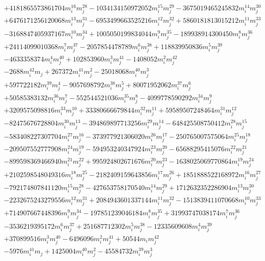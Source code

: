 {\begin{align*}
&+4181865573861704m_i^{16}m_j^{28}-1034134150972052m_i^{15}m_j^{29}-3675019465245832m_i^{14}m_j^{30}\\
&+6476171256120068m_i^{13}m_j^{31}-6953499663525216m_i^{12}m_j^{32}+5860181813015212m_i^{11}m_j^{33}\\
&-3168847405937167m_i^{10}m_j^{34}+1005050199834044m_i^{9}m_j^{35}-189938914300450m_i^{8}m_j^{36}\\
&+24114099010368m_i^{7}m_j^{37}-2057854478789m_i^{6}m_j^{38}+118839950836m_i^{5}m_j^{39}\\
&-4633358374m_i^{4}m_j^{40}+102853960m_i^{3}m_j^{41}-1408052m_i^{2}m_j^{42}\\
&-2688m_i^{42}m_j+267372m_i^{41}m_j^{2}-25018068m_i^{40}m_j^{3}\\
&+597722182m_i^{39}m_j^{4}-9057698792m_i^{38}m_j^{5}+80071952062m_i^{37}m_j^{6}\\
&+50585383132m_i^{36}m_j^{7}-552544521036m_i^{35}m_j^{8}-4099778590292m_i^{34}m_j^{9}\\
&+3209575098816m_i^{33}m_j^{10}+33380666679844m_i^{32}m_j^{11}+59589507248464m_i^{31}m_j^{12}\\
&-82475676728804m_i^{30}m_j^{13}-394869897713256m_i^{29}m_j^{14}-648425508750412m_i^{28}m_j^{15}\\
&-583408227307704m_i^{27}m_j^{16}-373977921306020m_i^{26}m_j^{17}-250765007575064m_i^{25}m_j^{18}\\
&-209507552777908m_i^{24}m_j^{19}-594953240347924m_i^{23}m_j^{20}-65688295415076m_i^{22}m_j^{21}\\
&-899598369466940m_i^{21}m_j^{22}+995924802671676m_i^{20}m_j^{23}-1638025069770864m_i^{19}m_j^{24}\\
&+2102598548049316m_i^{18}m_j^{25}-2182409159643856m_i^{17}m_j^{26}+1851888522168972m_i^{16}m_j^{27}\\
&-792174807841120m_i^{15}m_j^{28}-427653758170540m_i^{14}m_j^{29}+1712632352286904m_i^{13}m_j^{30}\\
&-2232675243279556m_i^{12}m_j^{31}+2084943601337144m_i^{11}m_j^{32}-1513839411070668m_i^{10}m_j^{33}\\
&+714907667448396m_i^{9}m_j^{34}-197851239046184m_i^{8}m_j^{35}+31993747038174m_i^{7}m_j^{36}\\
&-3536219395172m_i^{6}m_j^{37}+251687712302m_i^{5}m_j^{38}-12335609608m_i^{4}m_j^{39}\\
&+370899516m_i^{3}m_j^{40}-6496096m_i^{2}m_j^{41}+50544m_im_j^{42}\\
&-5976m_i^{41}m_j+1425004m_i^{40}m_j^{2}-45584732m_i^{39}m_j^{3}\\

\end{align*}}
